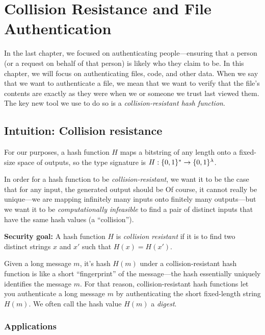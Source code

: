 \chapter{Collision Resistance and File Authentication}

In the last chapter, we focused on authenticating people---ensuring that
a person (or a request on behalf of that person) is likely who they claim to be.
In this chapter, we will focus on authenticating
files, code, and other data.
When we say that we want to authenticate a file,
we mean that we want to verify that the file's
contents are exactly as they were when we or
someone we trust last viewed them.
The key new tool we use to do so is a \textit{collision-resistant hash function}. 

\section{Intuition: Collision resistance}
For our purposes, a hash function $H$ 
maps a bitstring of any length onto a fixed-size space of outputs,
so the type signature is $H: \{0,1\}^* \rightarrow \{0,1\}^{\lambda}$.

In order for a hash function to be \textit{collision-resistant}, we want it to be the case that for any input, the generated output should be  Of course, it cannot really be unique---we are mapping infinitely many inputs onto finitely many outputs---but we want it to be \textit{computationally infeasible} to find a 
pair of distinct inputs that have the same hash values (a ``collision'').

\begin{framed}
\noindent
\textbf{Security goal:} A hash function $H$ is \emph{collision resistant} if
it is  to find two distinct strings
$x$ and $x'$ such that $H(x) = H(x')$.
\end{framed}

Given a long message $m$, it's hash $H(m)$ under a collision-resistant
hash function is like a short ``fingerprint'' of the message---the
hash essentially uniquely identifies the message $m$.
For that reason, collision-resistant hash functions let you authenticate 
a long message $m$ by authenticating the  short fixed-length string $H(m)$.
We often call the hash value $H(m)$ a \emph{digest}.

\subsection{Applications}
